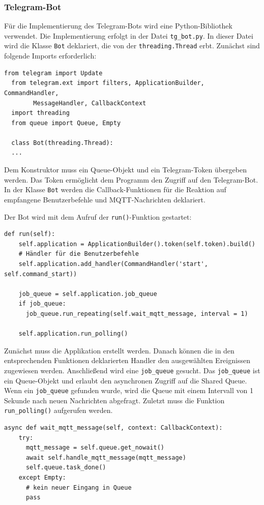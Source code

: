 \documentclass[12pt, letterpaper]{article}
\begin{document}
\subsubsection{Telegram-Bot}
\par Für die Implementierung des Telegram-Bots wird eine Python-Bibliothek verwendet. Die Implementierung erfolgt in der Datei \texttt{tg\_bot.py}. In dieser Datei wird die Klasse \texttt{Bot} deklariert, die von der \texttt{threading.Thread} erbt. Zunächst sind folgende Imports erforderlich:
\begin{Verbatim}[frame=single]
  from telegram import Update
  from telegram.ext import filters, ApplicationBuilder, CommandHandler, 
        MessageHandler, CallbackContext
  import threading
  from queue import Queue, Empty

  class Bot(threading.Thread):
  ...
\end{Verbatim}
\par Dem Konstruktor muss ein Queue-Objekt und ein Telegram-Token übergeben werden. Das Token ermöglicht dem Programm den Zugriff auf den Telegram-Bot. In der Klasse \texttt{Bot} werden die Callback-Funktionen für die Reaktion auf empfangene Benutzerbefehle und MQTT-Nachrichten deklariert.
\par Der Bot wird mit dem Aufruf der \texttt{run()}-Funktion gestartet:
\begin{Verbatim}[frame=single]
  def run(self):
    self.application = ApplicationBuilder().token(self.token).build()
    # Händler für die Benutzerbefehle
    self.application.add_handler(CommandHandler('start', self.command_start))
    
    job_queue = self.application.job_queue
    if job_queue:
      job_queue.run_repeating(self.wait_mqtt_message, interval = 1)

    self.application.run_polling()
\end{Verbatim}
\par Zunächst muss die Applikation erstellt werden. Danach können die in den entsprechenden Funktionen deklarierten Handler den ausgewählten Ereignissen zugewiesen werden. Anschließend wird eine \texttt{job\_queue} gesucht. Das \texttt{job\_queue} ist ein Queue-Objekt und erlaubt den asynchronen Zugriff auf die Shared Queue. Wenn ein \texttt{job\_queue} gefunden wurde, wird die Queue mit einem Intervall von 1 Sekunde nach neuen Nachrichten abgefragt. Zuletzt muss die Funktion \texttt{run\_polling()} aufgerufen werden.
\begin{Verbatim}[frame=single]
  async def wait_mqtt_message(self, context: CallbackContext):
    try:
      mqtt_message = self.queue.get_nowait()
      await self.handle_mqtt_message(mqtt_message)
      self.queue.task_done()
    except Empty:
      # kein neuer Eingang in Queue
      pass
\end{Verbatim}
\end{document}
